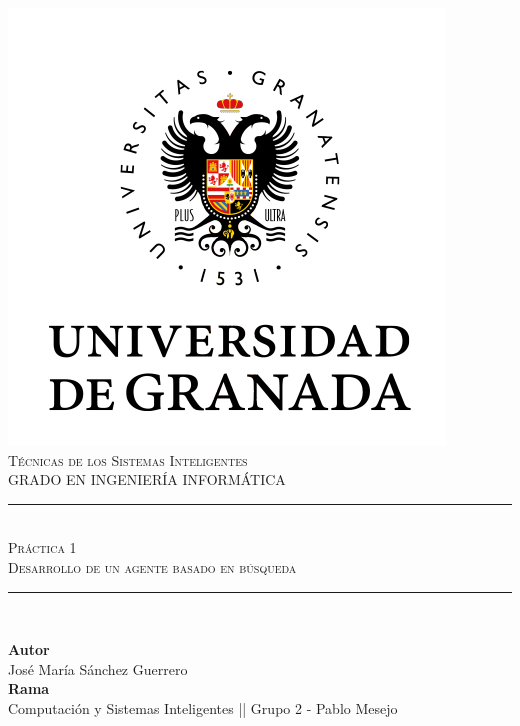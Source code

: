 \documentclass[11pt,a4paper]{article}
\newcommand{\asignatura}{Técnicas de los Sistemas Inteligentes}
\newcommand{\autor}{José María Sánchez Guerrero}
\newcommand{\titulo}{Práctica 1}
\newcommand{\subtitulo}{Desarrollo de un agente basado en búsqueda}
\begin{document}

\begin{titlepage}

\begin{minipage}{\textwidth}

\centering

\includegraphics[scale=0.5]{img/ugr.png}\\

\textsc{\Large \asignatura{}\\[0.2cm]}
\textsc{GRADO EN INGENIERÍA INFORMÁTICA}\\[1cm]

\noindent\rule[-1ex]{\textwidth}{1pt}\\[1.5ex]
\textsc{{\Huge \titulo\\[0.5ex]}}
\textsc{{\Large \subtitulo\\}}
\noindent\rule[-1ex]{\textwidth}{2pt}\\[3.5ex]

\end{minipage}

\vspace{0.5cm}

\begin{minipage}{\textwidth}

\centering

\textbf{Autor}\\ {\autor{}}\\[2.5ex]
\textbf{Rama}\\ {Computación y Sistemas Inteligentes || Grupo 2 - Pablo Mesejo}\\[2.5ex]
\vspace{0.3cm}


\end{minipage}
\end{titlepage}
\end{document}
